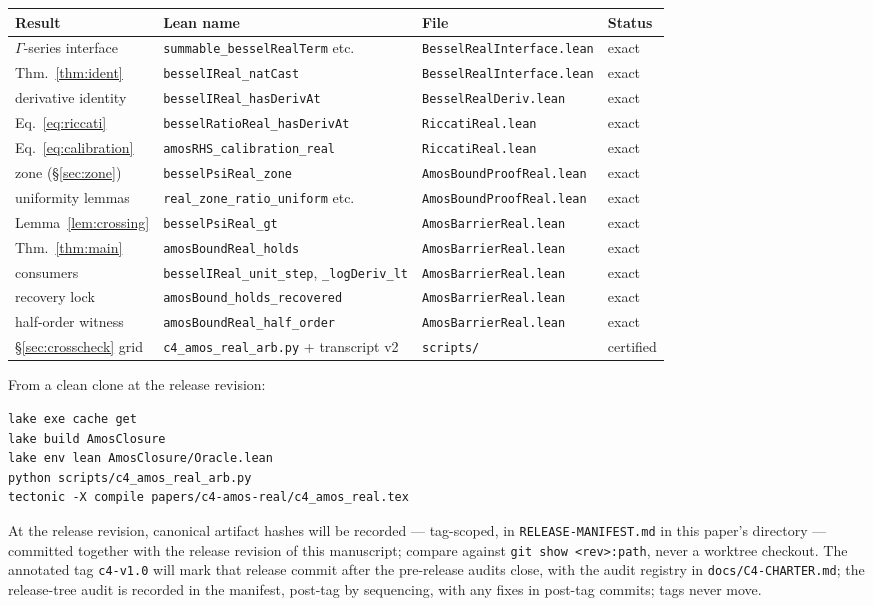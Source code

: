 \documentclass[11pt]{article}
\newcommand{\lean}[1]{\texttt{#1}}
\begin{document}
\begin{center}
\footnotesize
\begin{tabular}{@{}llll@{}}
\toprule
Result & Lean name & File & Status \\
\midrule
$\Gamma$-series interface & \lean{summable\_besselRealTerm} etc. & \lean{BesselRealInterface.lean} & exact \\
Thm.~\ref{thm:ident} & \lean{besselIReal\_natCast} & \lean{BesselRealInterface.lean} & exact \\
derivative identity & \lean{besselIReal\_hasDerivAt} & \lean{BesselRealDeriv.lean} & exact \\
Eq.~\eqref{eq:riccati} & \lean{besselRatioReal\_hasDerivAt} & \lean{RiccatiReal.lean} & exact \\
Eq.~\eqref{eq:calibration} & \lean{amosRHS\_calibration\_real} & \lean{RiccatiReal.lean} & exact \\
zone (\S\ref{sec:zone}) & \lean{besselPsiReal\_zone} & \lean{AmosBoundProofReal.lean} & exact \\
uniformity lemmas & \lean{real\_zone\_ratio\_uniform} etc. & \lean{AmosBoundProofReal.lean} & exact \\
Lemma~\ref{lem:crossing} & \lean{besselPsiReal\_gt} & \lean{AmosBarrierReal.lean} & exact \\
Thm.~\ref{thm:main} & \lean{amosBoundReal\_holds} & \lean{AmosBarrierReal.lean} & exact \\
consumers & \lean{besselIReal\_unit\_step}, \lean{\_logDeriv\_lt} & \lean{AmosBarrierReal.lean} & exact \\
recovery lock & \lean{amosBound\_holds\_recovered} & \lean{AmosBarrierReal.lean} & exact \\
half-order witness & \lean{amosBoundReal\_half\_order} & \lean{AmosBarrierReal.lean} & exact \\
\S\ref{sec:crosscheck} grid & \lean{c4\_amos\_real\_arb.py} + transcript v2 & \lean{scripts/} & certified \\
\bottomrule
\end{tabular}
\end{center}

\medskip
\noindent From a clean clone at the release revision:
\begin{verbatim}
lake exe cache get
lake build AmosClosure
lake env lean AmosClosure/Oracle.lean
python scripts/c4_amos_real_arb.py
tectonic -X compile papers/c4-amos-real/c4_amos_real.tex
\end{verbatim}
{\sloppy
At the release revision, canonical artifact hashes will be
recorded --- tag-scoped, in \lean{RELEASE-MANIFEST.md} in this
paper's directory --- committed together with the release revision
of this manuscript; compare against
\lean{git show <rev>:path}, never a worktree checkout.  The
annotated tag \lean{c4-v1.0} will mark that release commit after
the pre-release audits close, with the audit registry in
\lean{docs/C4-CHARTER.md}; the release-tree audit is recorded in
the manifest, post-tag by sequencing, with any fixes in post-tag
commits; tags never move.\par}
\end{document}
